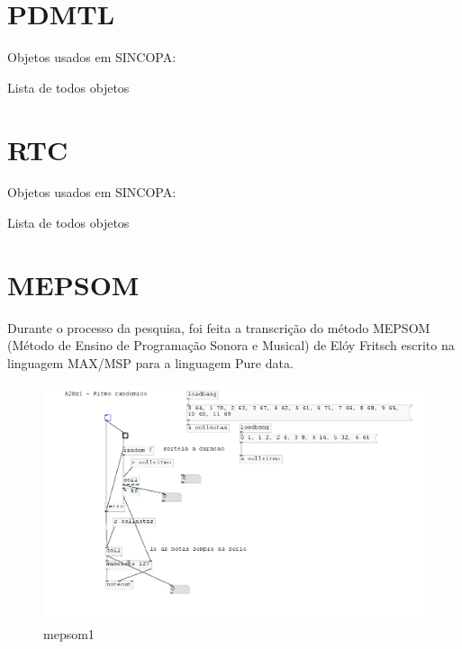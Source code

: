 \documentclass{ppgmus}
\begin{document}
\section{PDMTL}
\label{pdmtl}

Objetos usados em SINCOPA:



Lista de todos objetos


\section{RTC}
\label{rtc}

Objetos usados em SINCOPA:


Lista de todos objetos


\section{MEPSOM}
\label{mepsom}

Durante o processo da pesquisa, foi feita a transcrição do método MEPSOM (Método de Ensino
de Programação Sonora e Musical) de Elóy Fritsch escrito na linguagem MAX/MSP para a linguagem
Pure data.


\begin{figure}
\includegraphics[scale=.4]{mepsom1}
\caption{mepsom1}
\label{mepsom1}
\end{figure}
\end{document}
